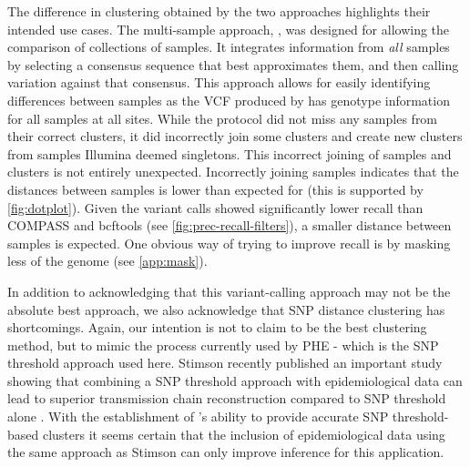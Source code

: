 The difference in clustering obtained by the two \pandora{} approaches highlights their intended use cases. The multi-sample approach, , was designed for allowing the comparison of collections of samples. It integrates information from \emph{all} samples by selecting a consensus sequence that best approximates them, and then calling variation against that consensus. This approach allows for easily identifying differences between samples as the VCF produced by  has genotype information for all samples at all sites. While the  protocol did not miss any samples from their correct clusters, it did incorrectly join some clusters and create new clusters from samples Illumina deemed singletons. This incorrect joining of samples and clusters is not entirely unexpected. Incorrectly joining samples indicates that the distances between samples is lower than expected for  (this is supported by \autoref{fig:dotplot}). Given the \pandora{} variant calls showed significantly lower recall than COMPASS and bcftools (see \autoref{fig:prec-recall-filters}), a smaller distance between samples is expected. One obvious way of trying to improve recall is by masking less of the genome (see \autoref{app:mask}). 

In addition to acknowledging that this variant-calling approach may not be the absolute best approach, we also acknowledge that SNP distance clustering has shortcomings. Again, our intention is not to claim to be the best clustering method, but to mimic the process currently used by PHE - which is the SNP threshold approach used here. Stimson \etal{} recently published an important study showing that combining a SNP threshold approach with epidemiological data can lead to superior transmission chain reconstruction compared to SNP threshold alone \cite{stimson2019}. With the establishment of \ont{}'s ability to provide accurate SNP threshold-based clusters it seems certain that the inclusion of epidemiological data using the same approach as Stimson \etal{} can only improve inference for this application.

